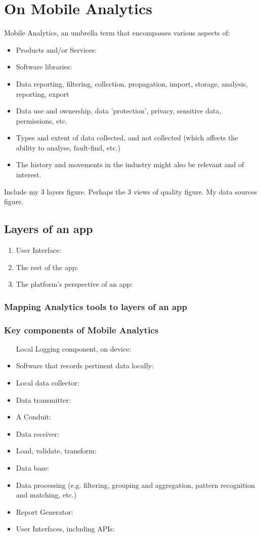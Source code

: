 \chapter{On Mobile Analytics}
Mobile Analytics, an umbrella term that encompasses various aspects of:
\begin{itemize}
    \item Products and/or Services:
    \item Software libraries:
    \item Data reporting, filtering, collection, propagation, import, storage, analysis, reporting, export
    \item Data use and ownership, data 'protection', privacy, sensitive data, permissions, etc.
    \item Types and extent of data collected, and not collected (which affects the ability to analyse, fault-find, etc.)
    \item The history and movements in the industry might also be relevant and of interest.
\end{itemize}

Include my 3 layers figure. Perhaps the 3 views of quality figure. My data sources figure. 

\section{Layers of an app}
\begin{enumerate}
    \item User Interface:
    \item The rest of the app:
    \item The platform's perspective of an app:
\end{enumerate}

\subsection{Mapping Analytics tools to layers of an app}

\subsection{Key components of Mobile Analytics}
\begin{itemize}
    \item [Local] Logging component, on device:
    \item Software that records pertinent data locally:
    \item Local data collector:
    \item Data transmitter:
    \item A Conduit:
    \item Data receiver:
    \item Load, validate, transform:
    \item Data base:
    \item Data processing (e.g. filtering, grouping and aggregation, pattern recognition and matching, etc.)
    \item Report Generator:
    \item User Interfaces, including APIs:
\end{itemize}

